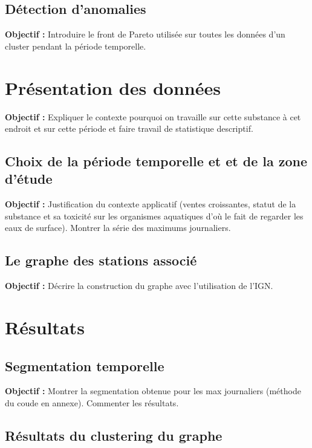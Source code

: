 \documentclass[12pt, twoside]{report}
\begin{document}
\subsection{Détection d'anomalies}

\textbf{Objectif :} Introduire le front de Pareto utilisée sur toutes les données d'un cluster pendant la période temporelle. 

\section{Présentation des données}

\textbf{Objectif :} Expliquer le contexte pourquoi on travaille sur cette substance à cet endroit et sur cette période et faire travail de statistique descriptif. 

\subsection{Choix de la période temporelle et et de la zone d'étude}

\textbf{Objectif :} Justification du contexte applicatif (ventes croissantes, statut de la substance et sa toxicité sur les organismes aquatiques d'où le fait de regarder les eaux de surface). Montrer la série des maximums journaliers.

\subsection{Le graphe des stations associé}

\textbf{Objectif :} Décrire la construction du graphe avec l'utilisation de l'IGN. 

\section{Résultats}

\subsection{Segmentation temporelle}

\textbf{Objectif :} Montrer la segmentation obtenue pour les max journaliers (méthode du coude en annexe). Commenter les résultats.

\subsection{Résultats du clustering du graphe}
\end{document}
